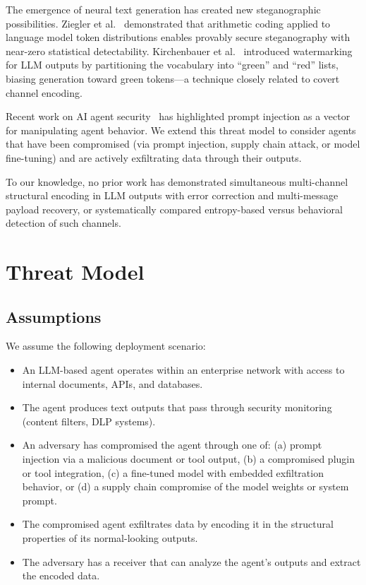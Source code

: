 \documentclass[11pt]{article}
\begin{document}
The emergence of neural text generation has created new steganographic
possibilities. Ziegler et al.~\cite{ziegler2019} demonstrated that
arithmetic coding applied to language model token distributions enables
provably secure steganography with near-zero statistical
detectability. Kirchenbauer et al.~\cite{kirchenbauer2023} introduced
watermarking for LLM outputs by partitioning the vocabulary into ``green''
and ``red'' lists, biasing generation toward green tokens---a technique
closely related to covert channel encoding.

Recent work on AI agent security~\cite{greshake2023} has highlighted prompt
injection as a vector for manipulating agent behavior. We extend this
threat model to consider agents that have been compromised (via prompt
injection, supply chain attack, or model fine-tuning) and are actively
exfiltrating data through their outputs.

To our knowledge, no prior work has demonstrated simultaneous multi-channel
structural encoding in LLM outputs with error correction and multi-message
payload recovery, or systematically compared entropy-based versus
behavioral detection of such channels.

\section{Threat Model}
\label{sec:threat}

\subsection{Assumptions}

We assume the following deployment scenario:
\begin{itemize}
  \item An LLM-based agent operates within an enterprise network with access
    to internal documents, APIs, and databases.
  \item The agent produces text outputs that pass through security monitoring
    (content filters, DLP systems).
  \item An adversary has compromised the agent through one of: (a) prompt
    injection via a malicious document or tool output, (b) a compromised
    plugin or tool integration, (c) a fine-tuned model with embedded
    exfiltration behavior, or (d) a supply chain compromise of the model
    weights or system prompt.
  \item The compromised agent exfiltrates data by encoding it in the
    structural properties of its normal-looking outputs.
  \item The adversary has a receiver that can analyze the agent's outputs
    and extract the encoded data.
\end{itemize}
\end{document}
